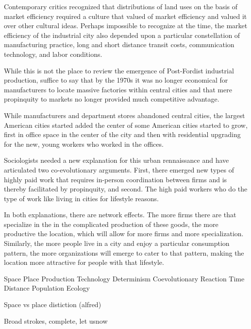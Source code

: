 \documentclass[12pt,draft,letter]{article}
\begin{document}
Contemporary critics recognized that distributions of land uses on the
basis of market efficiency required a culture that valued of market
efficiency and valued it over other cultural ideas. Perhaps impossible
to recognize at the time, the market efficiency of the industrial city
also depended upon a particular constellation of manufacturing
practice, long and short distance transit costs, communication
technology, and labor conditions. 

While this is not the place to review the emergence of Post-Fordist
industrial production, suffice to say that by the 1970s it was no
longer economical for manufacturers to locate massive factories within
central cities and that mere propinquity to markets no longer provided
much competitive advantage.

While manufacturers and department stores abandoned central cities,
the largest American cities started added the center of some American
cities started to grow, first in office space in the center of the
city and then with residential upgrading for the new, young workers
who worked in the offices. 

Sociologists needed a new explanation for this urban rennaissance and
have articulated two co-evolutionary arguments. First, there emerged
new types of highly paid work that requires in-person coordination
between firms and is thereby facilitated by propinquity, and
second. The high paid workers who do the type of work like living in
cities for lifestyle reasons.

In both explanations, there are network effects. The more firms there
are that specialize in the in the complicated production of these
goods, the more productive the location, which will allow for more
firms and more specialization. Similarly, the more people live in a
city and enjoy a particular consumption pattern, the more
organizations will emerge to cater to that pattern, making the
location more attractive for people with that lifestyle.




            Space                    Place
Production  Technology Determinism   Coevolutionary   
Reaction    Time Distance            Population Ecology







Space vs place distiction (alfred)


Broad strokes, complete, let usnow 
\end{document}
